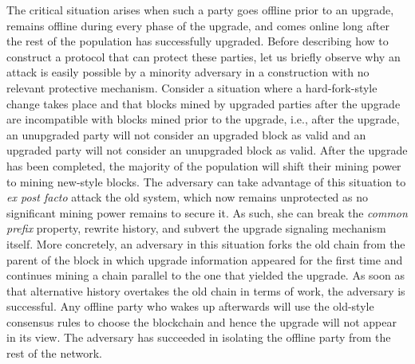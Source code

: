 The critical situation arises when such a party goes offline prior to an upgrade, remains offline during
every phase of the upgrade, and comes online long after the rest of the population has successfully
upgraded. Before describing how to construct a protocol that can protect these parties, let us briefly observe
why an attack is easily possible by a minority adversary in a construction with no relevant protective mechanism.
Consider a situation where a hard-fork-style change takes place and that blocks mined by upgraded parties after
the upgrade are incompatible with blocks mined prior to the upgrade, i.e., after the upgrade, an unupgraded party
will not consider an upgraded block as valid and an upgraded party will not consider an unupgraded block as valid.
After the upgrade has been completed, the majority of the population will shift their mining power to mining new-style
blocks. The adversary can take advantage of this situation to \emph{ex post facto} attack the old system, which
now remains unprotected as no significant mining power remains to secure it. As such, she can break
the \emph{common prefix} property, rewrite history, and subvert the upgrade signaling mechanism itself. More
concretely, an adversary in this situation forks the old chain from the parent of the block in which upgrade
information appeared for the first time and continues mining a chain parallel to the one that yielded
the upgrade. As soon as that alternative history overtakes the old chain in terms of work, the adversary is
successful. Any offline party who wakes up afterwards will use the old-style consensus rules to choose
the blockchain and hence the upgrade will not appear in its view. The adversary has
succeeded in isolating the offline party from the rest of the network.

